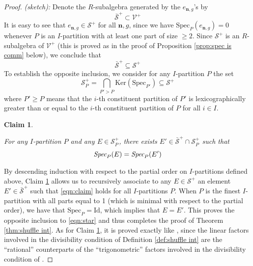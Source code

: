 \documentclass{amsart}
\newtheorem{claim}[theorem]{Claim}
\def\CS{{\mathcal{S}}}
\def\CV{{\mathcal{V}}}
\def\bn{{\boldsymbol{n}}}
\def\ring{R}
\begin{document}
\medskip 

\begin{proof} \emph{(sketch):} Denote the $\ring$-subalgebra generated by the $e_{\bn,g}$'s by
\begin{equation}
\label{eqn:subalgebra generated by}
\bar{\CS}^+ \subset \CV^+
\end{equation}
It is easy to see that $e_{\bn,g} \in \CS^+$ for all $\bn,g$, since we have $\text{Spec}_P(e_{\bn,g}) = 0$ whenever $P$ is an $I$-partition with at least one part of size $\geq 2$. Since $\CS^+$ is an $\ring$-subalgebra of $\CV^+$ (this is proved as in the proof of Proposition \ref{prop:spec is comm} below), we conclude that
\begin{equation}
\label{eqn:star}
\bar{\CS}^+ \subseteq \CS^+
\end{equation}
To establish the opposite inclusion, we consider for any $I$-partition $P$ the set
$$
\CS^+_P = \bigcap_{P' > P} \text{Ker}(\text{Spec}_{P'}) \subseteq \CS^+
$$
where $P' \geq P$ means that the $i$-th constituent partition of $P'$ is lexicographically greater than or equal to the $i$-th constituent partition of $P$ for all $i \in I$.  

\medskip

\begin{claim}
\label{claim}

For any $I$-partition $P$ and any $E \in \CS^+_P$, there exists $E' \in \bar{\CS}^+ \cap \CS^+_P$ such that
\begin{equation}
\label{eqn:claim}
\emph{Spec}_P(E) = \emph{Spec}_P(E')
\end{equation}

\end{claim}

\medskip 

\noindent By descending induction with respect to the partial order on $I$-partitions defined above, Claim \ref{claim} allows us to recursively associate to any $E \in \CS^+$ an element $E' \in \bar{\CS}^+$ such that \eqref{eqn:claim} holds for all $I$-partitions $P$. When $P$ is the finest $I$-partition with all parts equal to 1 (which is minimal with respect to the partial order), we have that $\text{Spec}_P = \text{Id}$, which implies that $E = E'$. This proves the opposite inclusion to \eqref{eqn:star} and thus completes the proof of Theorem \ref{thm:shuffle int}. As for Claim \ref{claim}, it is proved exactly like \cite[Claim 5.2]{JNCoulomb}, since the linear factors involved in the divisibility condition of Definition \ref{def:shuffle int} are the ``rational'' counterparts of the ``trigonometric'' factors involved in the divisibility condition of \cite[Definition 2.5]{JNCoulomb}. \end{proof}
\end{document}
